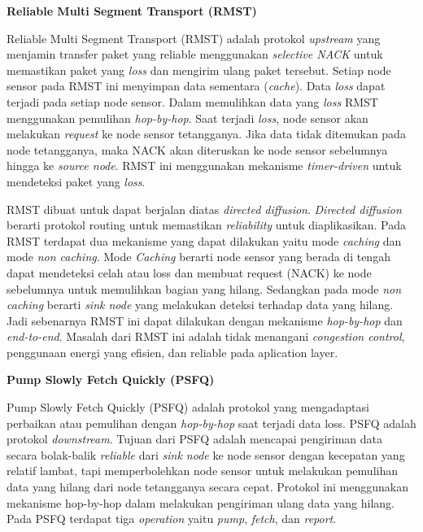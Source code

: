 \documentclass[a4paper,twoside]{article}
\begin{document}
\begin{enumerate}
\textbf{Reliable Multi Segment Transport (RMST)}

Reliable Multi Segment Transport (RMST) adalah protokol \textit{upstream} yang menjamin transfer paket yang reliable menggunakan \textit{selective NACK} untuk memastikan paket yang \textit{loss} dan mengirim ulang paket tersebut. Setiap node sensor pada RMST ini menyimpan data sementara (\textit{cache}). Data \textit{loss} dapat terjadi pada setiap node sensor. Dalam memulihkan data yang \textit{loss} RMST menggunakan pemulihan \textit{hop-by-hop}. Saat terjadi \textit{loss}, node sensor akan melakukan \textit{request} ke node sensor tetangganya. Jika data tidak ditemukan pada node tetangganya, maka NACK akan diteruskan ke node sensor sebelumnya hingga ke \textit{source node}. RMST ini menggunakan mekanisme \textit{timer-driven} untuk mendeteksi paket yang \textit{loss}. 

RMST dibuat untuk dapat berjalan diatas \textit{directed diffusion}. \textit{Directed diffusion} berarti protokol routing untuk memastikan \textit{reliability} untuk diaplikasikan. Pada RMST terdapat dua mekanisme yang dapat dilakukan yaitu mode \textit{caching} dan mode \textit{non caching}. Mode \textit{Caching} berarti node sensor yang berada di tengah dapat mendeteksi celah atau loss dan membuat request (NACK) ke node sebelumnya untuk memulihkan bagian yang hilang. Sedangkan pada mode \textit{non caching} berarti \textit{sink node} yang melakukan deteksi terhadap data yang hilang. Jadi sebenarnya RMST ini dapat dilakukan dengan mekanisme \textit{hop-by-hop} dan \textit{end-to-end}. Masalah dari RMST ini adalah tidak menangani \textit{congestion control}, penggunaan energi yang efisien, dan reliable pada aplication layer.


\textbf{Pump Slowly Fetch Quickly (PSFQ)}

Pump Slowly Fetch Quickly (PSFQ) adalah protokol yang mengadaptasi perbaikan atau pemulihan dengan \textit{hop-by-hop} saat terjadi data loss. PSFQ adalah protokol \textit{downstream}. Tujuan dari PSFQ adalah mencapai pengiriman data secara bolak-balik  \textit{reliable} dari \textit{sink node} ke node sensor dengan kecepatan yang relatif lambat, tapi memperbolehkan node sensor untuk melakukan pemulihan data yang hilang dari node tetangganya secara cepat. Protokol ini menggunakan mekanisme hop-by-hop dalam melakukan pengiriman ulang data yang hilang. Pada PSFQ terdapat tiga \textit{operation} yaitu \textit{pump}, \textit{fetch}, dan \textit{report}. 


\end{enumerate}
\end{document}
